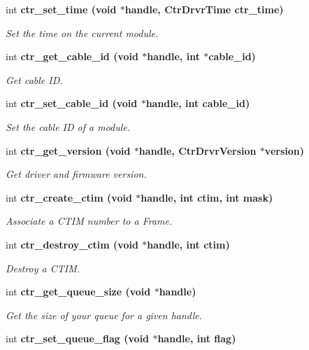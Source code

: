 \begin{CompactItemize}
int \bf{ctr\_\-set\_\-time} (void $\ast$handle, Ctr\-Drvr\-Time ctr\_\-time)
\begin{CompactList}\small\item\em Set the time on the current module. \item\end{CompactList}\item 
int \bf{ctr\_\-get\_\-cable\_\-id} (void $\ast$handle, int $\ast$cable\_\-id)
\begin{CompactList}\small\item\em Get cable ID. \item\end{CompactList}\item 
int \bf{ctr\_\-set\_\-cable\_\-id} (void $\ast$handle, int cable\_\-id)
\begin{CompactList}\small\item\em Set the cable ID of a module. \item\end{CompactList}\item 
int \bf{ctr\_\-get\_\-version} (void $\ast$handle, Ctr\-Drvr\-Version $\ast$version)
\begin{CompactList}\small\item\em Get driver and firmware version. \item\end{CompactList}\item 
int \bf{ctr\_\-create\_\-ctim} (void $\ast$handle, int ctim, int mask)
\begin{CompactList}\small\item\em Associate a CTIM number to a Frame. \item\end{CompactList}\item 
int \bf{ctr\_\-destroy\_\-ctim} (void $\ast$handle, int ctim)
\begin{CompactList}\small\item\em Destroy a CTIM. \item\end{CompactList}\item 
int \bf{ctr\_\-get\_\-queue\_\-size} (void $\ast$handle)
\begin{CompactList}\small\item\em Get the size of your queue for a given handle. \item\end{CompactList}\item 
int \bf{ctr\_\-set\_\-queue\_\-flag} (void $\ast$handle, int flag)

\end{CompactItemize}
